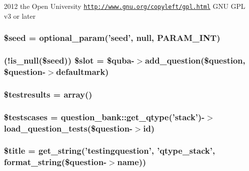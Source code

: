 2012 the Open University  \href{http://www.gnu.org/copyleft/gpl.html}{\tt http://www.gnu.org/copyleft/gpl.html} GNU GPL v3 or later \hypertarget{questiontestrun_8php_a4aea6700edf05cf13c65dc0e758c9ad3}{
\subsubsection[{\$seed}]{\setlength{\rightskip}{0pt plus 5cm}\$seed = optional\_\-param('seed', null, PARAM\_\-INT)}}
\label{questiontestrun_8php_a4aea6700edf05cf13c65dc0e758c9ad3}
\hypertarget{questiontestrun_8php_a9104834405465b12845577f042dae3f0}{
\subsubsection[{\$slot}]{ (!is\_\-null(\$seed)) \$slot = \$quba-\/$>$add\_\-question(\$question, \$question-\/$>$defaultmark)}}
\label{questiontestrun_8php_a9104834405465b12845577f042dae3f0}
\hypertarget{questiontestrun_8php_a3e5313c6f829a7878736c734704294fd}{
\subsubsection[{\$testresults}]{\setlength{\rightskip}{0pt plus 5cm}\$testresults = array()}}
\label{questiontestrun_8php_a3e5313c6f829a7878736c734704294fd}
\hypertarget{questiontestrun_8php_a964bf7377831044ea8f3228e1323ddf2}{
\subsubsection[{\$testscases}]{\setlength{\rightskip}{0pt plus 5cm}\$testscases = question\_\-bank::get\_\-qtype('stack')-\/$>$load\_\-question\_\-tests(\$question-\/$>$id)}}
\label{questiontestrun_8php_a964bf7377831044ea8f3228e1323ddf2}
\hypertarget{questiontestrun_8php_ada57e7bb7c152edad18fe2f166188691}{
\subsubsection[{\$title}]{\setlength{\rightskip}{0pt plus 5cm}\$title = get\_\-string('testingquestion', '{\bf qtype\_\-stack}', format\_\-string(\$question-\/$>$name))}}
